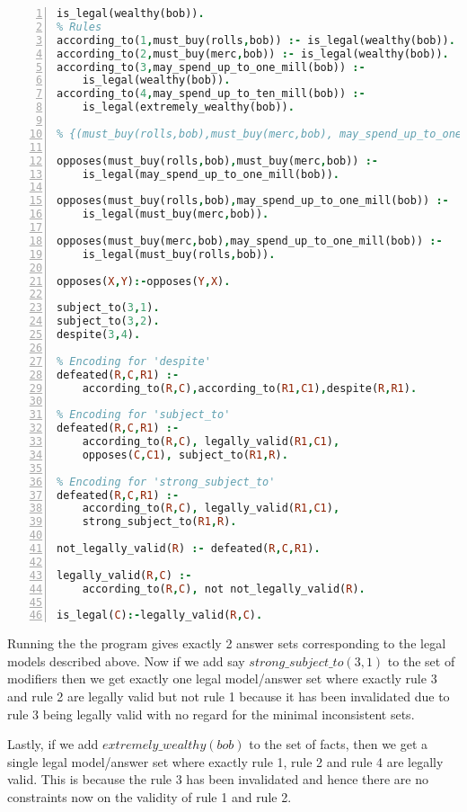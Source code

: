 \begin{lstlisting}[language=Prolog, numbers=left]
is_legal(wealthy(bob)).
% Rules
according_to(1,must_buy(rolls,bob)) :- is_legal(wealthy(bob)).
according_to(2,must_buy(merc,bob)) :- is_legal(wealthy(bob)).
according_to(3,may_spend_up_to_one_mill(bob)) :-
    is_legal(wealthy(bob)).
according_to(4,may_spend_up_to_ten_mill(bob)) :-
    is_legal(extremely_wealthy(bob)).

% {(must_buy(rolls,bob),must_buy(merc,bob), may_spend_up_to_one_mill(bob)} is a min. inconsistent set.

opposes(must_buy(rolls,bob),must_buy(merc,bob)) :-
    is_legal(may_spend_up_to_one_mill(bob)).

opposes(must_buy(rolls,bob),may_spend_up_to_one_mill(bob)) :-
    is_legal(must_buy(merc,bob)).

opposes(must_buy(merc,bob),may_spend_up_to_one_mill(bob)) :-
    is_legal(must_buy(rolls,bob)).

opposes(X,Y):-opposes(Y,X).

subject_to(3,1).
subject_to(3,2).
despite(3,4).

% Encoding for 'despite'
defeated(R,C,R1) :-
    according_to(R,C),according_to(R1,C1),despite(R,R1).

% Encoding for 'subject_to'
defeated(R,C,R1) :-
    according_to(R,C), legally_valid(R1,C1),
    opposes(C,C1), subject_to(R1,R).

% Encoding for 'strong_subject_to'
defeated(R,C,R1) :-
    according_to(R,C), legally_valid(R1,C1),
    strong_subject_to(R1,R).

not_legally_valid(R) :- defeated(R,C,R1).

legally_valid(R,C) :- 
    according_to(R,C), not not_legally_valid(R).

is_legal(C):-legally_valid(R,C).
\end{lstlisting}
Running the the program gives exactly 2 answer sets corresponding to the legal models described above. Now if we add say $strong\_subject\_to(3,1)$ to the set of modifiers then we get exactly one legal model/answer set where exactly rule 3 and rule 2 are legally valid but not rule 1 because it has been invalidated due to rule 3 being legally valid with no regard for the minimal inconsistent sets.

Lastly, if we add $extremely\_wealthy(bob)$ to the set of facts, then we get a single legal model/answer set where exactly rule 1, rule 2 and rule 4 are legally valid. This is because the rule 3 has been invalidated and hence there are no constraints now on the validity of rule 1 and rule 2.

